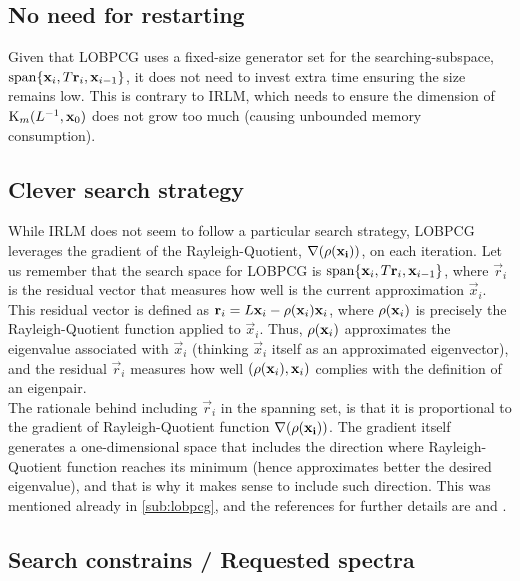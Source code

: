 \subsection{No need for restarting}

Given that \gls{LOBPCG} uses a fixed-size generator set for the
searching-subspace, $\func{span} \{\vec{x}_i, T\vec{r}_i,
\vec{x}_{i-1}\}$, it does not need to invest extra time ensuring the
size remains low. This is contrary to \gls{IRLM}, which needs to
ensure the dimension of $\Krylov{\inv{L}}{\vec{x}_0}{m}$ does not grow
too much (causing unbounded memory consumption).

\subsection{Clever search strategy}

While \gls{IRLM} does not seem to follow a particular search strategy,
\gls{LOBPCG} leverages the gradient of the Rayleigh-Quotient, $\nabla
(\func{\rho}(\vec{x_i}))$, on each iteration. Let us remember that the
search space for \gls{LOBPCG} is $\func{span} \{\vec{x}_i, T\vec{r}_i,
\vec{x}_{i-1}\}$, where $\vec{r}_i$ is the residual vector that measures
how well is the current approximation $\vec{x}_i$. This residual vector
is defined as $\vec{r}_i = L\vec{x}_i -
\func{\rho}(\vec{x}_i)\vec{x}_i$, where $\func{\rho}(\vec{x}_i)$ is
precisely the Rayleigh-Quotient function applied to $\vec{x}_i$. Thus,
$\func{\rho}(\vec{x}_i)$ approximates the eigenvalue associated with
$\vec{x}_i$ (thinking $\vec{x}_i$ itself as an approximated
eigenvector), and the residual $\vec{r}_i$ measures how well
$\left(\func{\rho}(\vec{x}_i), \vec{x}_i\right)$ complies with the
definition of an eigenpair. \\

The rationale behind including $\vec{r}_i$
in the spanning set, is that it is proportional to the gradient of
Rayleigh-Quotient function $\nabla(\func{\rho}(\vec{x_i}))$. The
gradient itself generates a one-dimensional space that includes the
direction where Rayleigh-Quotient function reaches its minimum (hence
approximates better the desired eigenvalue), and that is why it makes
sense to include such direction. This was mentioned already in
\cref{sub:lobpcg}, and the references for further details are 
\cite{knyazev01} and \cite{lashuk07}.

\subsection{Search constrains / Requested spectra}

